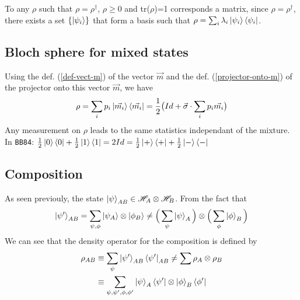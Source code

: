 \documentclass{article}
\begin{document}
To any $\rho$ such that $\rho=\rho^\dagger$, $\rho \geq 0$ and tr($\rho$)=1
corresponds a matrix, since $\rho=\rho^\dagger$, there exists a set
$\{\ket{\psi_i}\}$ that form a basis such that
$\rho=\sum_i\lambda_i\ket{\psi_i}\bra{\psi_i}$.


\subsection{Bloch sphere for mixed states}
Using the def. (\ref{def-vect-m}) of the vector $\vec{m}$ and the def.
(\ref{projector-onto-m}) of the projector onto this vector $\vec{m}$, we have
\begin{equation}
    \rho = \sum_ip_i\ket{\vec{m_i}}\bra{\vec{m_i}} = \frac{1}{2}\big(Id+\vec{\sigma}\cdot\sum_ip_i\vec{m_i}\big)
\end{equation}
Any measurement on $\rho$ leads to the same statistics independant of the
mixture.\\
In \texttt{BB84}:
$
\frac{1}{2}\ket{0}\bra{0} + \frac{1}{2} \ket{1}\bra{1}
=2Id=
\frac{1}{2}\ket{+}\bra{+} + \frac{1}{2} \ket{-}\bra{-}
$

\subsection{Composition}
As seen previouly, the state $\ket{\psi}_{AB} \in \mathscr{H}_A \otimes
\mathscr{H}_B$. From the fact that
\begin{equation}
    \ket{\psi'}_{AB} = \sum_{\psi, \phi}\ket{\psi_A}\otimes\ket{\phi_B}
    \neq \Big(\sum_{\psi}\ket{\psi}_A\Big) \otimes \Big(\sum_{\phi}\ket{\phi}_B\Big)
\end{equation}
We can see that the density operator for the composition is defined by
\begin{equation}
    \begin{aligned}
        \rho_{AB}
            & \equiv \sum_{\psi}\ket{\psi'}_{AB}\bra{\psi'}_{AB} \neq \sum \rho_A \otimes \rho_B \\
            & \equiv \sum_{\psi,\psi',\phi,\phi'}\ket{\psi}_A\bra{\psi'}\otimes\ket{\phi}_B\bra{\phi'}
    \end{aligned}
\end{equation}
\end{document}
